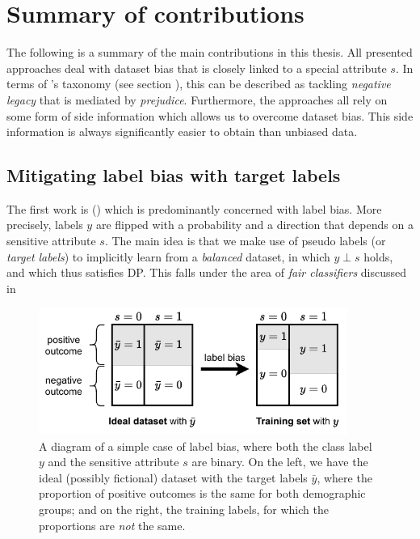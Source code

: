 \chapter{Summary of contributions}\label{ch:content}
The following is a summary of the main contributions in this thesis.
All presented approaches deal with dataset bias that is closely linked to a special attribute $s$.
In terms of \citet{kamishima2012fairness}'s taxonomy (see section ),
this can be described as tackling \emph{negative legacy} that is mediated by \emph{prejudice}.
Furthermore, the approaches all rely on some form of side information which allows us to overcome dataset bias.
This side information is always significantly easier to obtain than unbiased data.

\section{Mitigating label bias with target labels}\label{sec:target-labels}
The first work is \citet{kehrenberg2020tuning} ()
which is predominantly concerned with label bias.
More precisely, labels \(y\) are flipped with a probability and a direction that depends on a sensitive attribute \(s\).
The main idea is that we make use of pseudo labels (or \emph{target labels})
to implicitly learn from a \emph{balanced} dataset,
in which \(y\perp s\) holds, and which thus satisfies \acf{DP}.
This falls under the area of \emph{fair classifiers} discussed in 

\begin{figure}[tp]
  \centering
  \includegraphics[width=0.9\textwidth]{figures/label_bias.pdf}
  \caption{%
    A diagram of a simple case of label bias, where both the class label \(y\) and the sensitive attribute \(s\) are binary.
    On the left, we have the ideal (possibly fictional) dataset with the target labels \(\bar{y}\),
    where the proportion of positive outcomes is the same for both demographic groups;
    and on the right, the training labels, for which the proportions are \emph{not} the same.
  }%
  \label{fig:label-bias-overview}
\end{figure}

